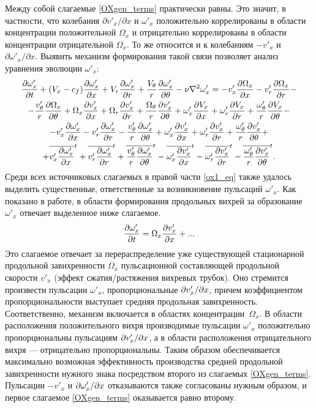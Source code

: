 Между собой слагаемые \eqref{OXgen_terms} практически равны. Это значит, в частности, что колебания $\partial v'_x / \partial x$ и $\omega'_x$ положительно коррелированы в области концентрации положительной $\Omega_x$ и отрицательно коррелированы в области концентрации отрицательной $\Omega_x$. То же относится и к колебаниям $-v'_x$ и $\partial \omega'_x / \partial x$. Выявить механизм формирования такой связи позволяет анализ уравнения эволюции $\omega'_x$:
\begin{multline}\label{ox1_eq}
\frac{\partial \omega'_x}{\partial t} + (V_x - c_f)\frac{\partial \omega'_x}{\partial x} + V_r \frac{\partial \omega_x'}{\partial r} + \frac{V_\theta}{r} \frac{\partial \omega'_x}{\partial \theta} 
- \nu\nabla^2\omega'_x = - v'_x \frac{\partial \Omega_x}{\partial x} - v'_r \frac{\partial \Omega_x}{\partial r} - \\ - \frac{v'_\theta}{r} \frac{\partial \Omega_x}{\partial \theta} 
+ \Omega_x \frac{\partial v'_x}{\partial x} + \Omega_r \frac{\partial v'_x}{\partial r} + \frac{\Omega_\theta}{r} \frac{\partial v'_x}{\partial \theta}
+ \omega'_x \frac{\partial V_x}{\partial x} + \omega'_r \frac{\partial V_x}{\partial r} + \frac{\omega'_\theta}{r} \frac{\partial V_x}{\partial \theta} - \\ 
- v'_x \frac{\partial \omega'_x}{\partial x} - v'_r \frac{\partial \omega'_x}{\partial r} - \frac{v'_\theta}{r} \frac{\partial \omega'_x}{\partial \theta} 
+ \omega'_x \frac{\partial v'_x}{\partial x} + \omega'_r \frac{\partial v'_x}{\partial r} + \frac{\omega'_\theta}{r} \frac{\partial v'_x}{\partial \theta} + \\
+ \overline{v'_x \frac{\partial \omega'_x}{\partial x}}^t + \overline{v'_r \frac{\partial \omega'_x}{\partial r}}^t + \overline{\frac{v'_\theta}{r} \frac{\partial \omega'_x}{\partial \theta}}^t
- \overline{\omega'_x \frac{\partial v'_x}{\partial x}}^t - \overline{\omega'_r \frac{\partial v'_x}{\partial r}}^t - \overline{\frac{\omega'_\theta}{r} \frac{\partial v'_x}{\partial \theta}}^t.
\end{multline}
Среди всех источниковых слагаемых в правой части \eqref{ox1_eq} также удалось выделить существенные, ответственные за возникновение пульсаций $\omega'_x$. Как показано в работе, в области формирования продольных вихрей за образование $\omega'_x$ отвечает выделенное ниже слагаемое.
\begin{equation}\label{ox1gen_main_terms}
\frac{\partial \omega'_x}{\partial t} = \Omega_x \frac {\partial v'_x}{\partial x} + ...
\end{equation}
Это слагаемое отвечает за перераспределение уже существующей стационарной продольной завихренности $\Omega_x$ пульсационной составляющей продольной скорости $v'_x$ (эффект сжатия/растяжения вихревых трубок). Оно стремится произвести пульсации $\omega'_x$, пропорциональные $\partial v'_x / \partial x$, причем коэффициентом пропорциональности выступает средняя продольная завихренность. Соответственно, механизм включается в областях концентрации~$\Omega_x$. В области расположения положительного вихря производимые пульсации $\omega'_x$ положительно пропорциональны пульсациям $\partial v'_x / \partial x$, а в области расположения отрицательного вихря --- отрицательно пропорциональны. Таким образом обеспечивается максимально возможная эффективность производства средней продольной завихренности нужного знака посредством второго из слагаемых \eqref{OXgen_terms}. Пульсации $-v'_x$ и $\partial \omega'_x / \partial x$ отказываются также согласованы нужным образом, и первое слагаемое \eqref{OXgen_terms} оказывается равно второму.


